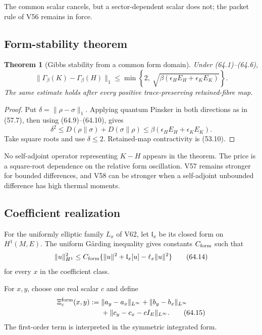 \documentclass[11pt]{article}
\newtheorem{theorem}{Theorem}[section]
\theoremstyle{remark}
\begin{document}
The common scalar cancels, but a sector-dependent scalar does not;
the packet rule of V56 remains in force.

\subsection{Form-stability theorem}

\begin{theorem}[Gibbs stability from a common form domain]
\label{thm:v12v64-form-stability}
Under (64.1)--(64.6),
\begin{equation}
 \boxed{
 \|\Gamma_\beta(K)-\Gamma_\beta(H)\|_1
 \leq
 \min\left\{
 2,\
 \sqrt{\beta(\epsilon_HE_H+\epsilon_KE_K)}
 \right\}.}                                      \tag{64.13}
\end{equation}
The same estimate holds after every positive trace-preserving
retained-fibre map.
\end{theorem}

\begin{proof}
Put \(\delta=\|\rho-\sigma\|_1\).  Applying quantum Pinsker in both
directions as in (57.7), then using (64.9)--(64.10), gives
\[
 \delta^2
 \leq
 D(\rho\|\sigma)+D(\sigma\|\rho)
 \leq
 \beta(\epsilon_HE_H+\epsilon_KE_K).
\]
Take square roots and use \(\delta\leq2\).  Retained-map
contractivity is (53.10).
\end{proof}

No self-adjoint operator representing \(K-H\) appears in the
theorem.  The price is a square-root dependence on the relative form
oscillation.  V57 remains stronger for bounded differences, and V58
can be stronger when a self-adjoint unbounded difference has high
thermal moments.

\subsection{Coefficient realization}

For the uniformly elliptic family \(L_x\) of V62, let
\(\mathfrak l_x\) be its closed form on \(H^1(M,E)\).  The uniform
G{\aa}rding inequality gives constants \(C_{\rm form}\) such that
\begin{equation}
 \|u\|_{H^1}^2
 \leq
 C_{\rm form}
 \{\|u\|^2+\mathfrak l_x[u]-\ell_x\|u\|^2\}
                                                        \tag{64.14}
\end{equation}
for every \(x\) in the coefficient class.

For \(x,y\), choose one real scalar \(c\) and define
\begin{align}
 \Xi_c^{\rm form}(x,y)
 :={}&
 \|a_y-a_x\|_{L^\infty}
 +\|b_y-b_x\|_{L^\infty}                         \nonumber\\
 &+
 \|c_y-c_x-cI_E\|_{L^\infty}.                    \tag{64.15}
\end{align}
The first-order term is interpreted in the symmetric integrated
form.
\end{document}
